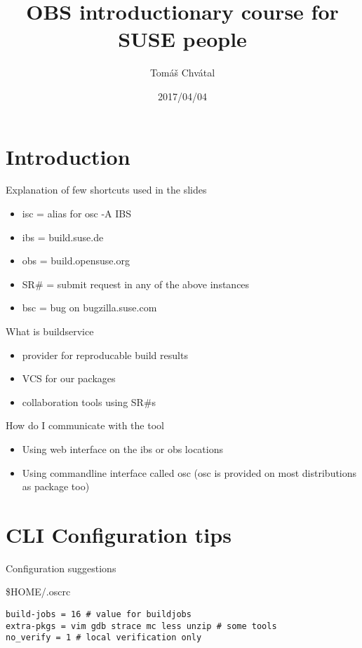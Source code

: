 \documentclass{beamer}
\author{Tom\'{a}\v{s} Chv\'{a}tal\newline {\small tchvatal@suse.com}\newline {\small L3-Packaging/Packaging}}
\title{OBS introductionary course for SUSE people}
\date{2017/04/04}
\begin{document}
\begin{frame}[t,plain]
\titlepage
\end{frame}

\section{Introduction}

\begin{frame}[t]{Explanation of few shortcuts used in the slides}
	\begin{itemize}
	\item isc = alias for osc -A IBS
	\item ibs = build.suse.de
	\item obs = build.opensuse.org
	\item SR\# = submit request in any of the above instances
	\item bsc = bug on bugzilla.suse.com
	\end{itemize}
\end{frame}

\begin{frame}[t]{What is buildservice}
	\begin{itemize}
	\item provider for reproducable build results
	\item VCS for our packages
	\item collaboration tools using SR\#s
	\end{itemize}
\end{frame}

\begin{frame}[t]{How do I communicate with the tool}
	\begin{itemize}
	\item Using web interface on the ibs or obs locations
	\item Using commandline interface called osc (osc is provided on most distributions as package too)
	\end{itemize}
\end{frame}

\section{CLI Configuration tips}

\begin{frame}[fragile]{Configuration suggestions}
	\begin{center}\$HOME/.oscrc\end{center}
	\begin{small}
	\begin{verbatim}
build-jobs = 16 # value for buildjobs
extra-pkgs = vim gdb strace mc less unzip # some tools
no_verify = 1 # local verification only
	\end{verbatim}
	\end{small}
\end{frame}
\end{document}
